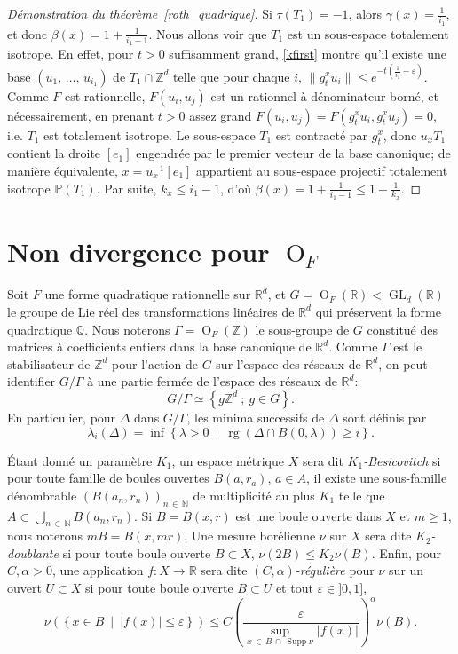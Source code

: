 \documentclass[AHL,Unicode,longabstracts,francais,published]{cedram}
\DeclareMathOperator{\GL}{GL}
\DeclareMathOperator{\GO}{O}
\DeclareMathOperator{\Supp}{Supp}
\DeclareMathOperator{\rg}{rg}
\newcommand{\R}{\mathbb{R}}
\newcommand{\Z}{\mathbb{Z}}
\newcommand{\N}{\mathbb{N}}
\newcommand{\Q}{\mathbb{Q}}
\newcommand{\PP}{\mathbb{P}}
\newcommand{\eps}{\varepsilon}
\begin{document}
\begin{proof}[Démonstration du théorème~\ref{roth_quadrique}]
Si $\tau(T_1)=-1$, alors $\gamma(x)=\frac{1}{i_1}$, et donc $\beta(x)=1+\frac{1}{i_1-1}$. Nous allons voir que $T_1$ est un sous-espace totalement isotrope. En effet, pour $t>0$ suffisamment grand, \eqref{kfirst} montre qu'il existe une base $(u_1,\,\dots,\,u_{i_1})$ de $T_1\cap\Z^d$ telle que pour chaque $i$, $\|g_t^xu_i\|\leq e^{-t(\frac{1}{i_1}-\eps)}$. Comme $F$ est rationnelle, $F(u_i,u_j)$ est un rationnel à dénominateur borné, et nécessairement, en prenant $t>0$ assez grand $F(u_i,u_j)=F(g_t^xu_i,g_t^xu_j)=0$, i.e. $T_1$ est totalement isotrope. Le sous-espace $T_1$ est contracté par $g_t^x$, donc $u_xT_1$ contient la droite $[e_1]$ engendrée par le premier vecteur de la base canonique; de manière équivalente, $x=u_x^{-1}[e_1]$ appartient au sous-espace projectif totalement isotrope $\PP(T_1)$. Par suite, $k_x\leq i_1-1$, d'où $\beta(x)=1+\frac{1}{i_1-1}\leq 1+\frac{1}{k_x}$.
\end{proof}



\section{Non divergence pour \texorpdfstring{$\GO_F$}{GOF}}\label{sec:nd}

Soit $F$ une forme quadratique rationnelle sur $\R^d$, et $G=\GO_F(\R)<\GL_d(\R)$ le groupe de Lie réel des transformations linéaires de $\R^d$ qui préservent la forme quadratique $\Q$. Nous noterons $\Gamma=\GO_F(\Z)$ le sous-groupe de $G$ constitué des matrices à coefficients entiers dans la base canonique de $\R^d$. Comme $\Gamma$ est le stabilisateur de $\Z^d$ pour l'action de $G$ sur l'espace des réseaux de $\R^d$, on peut identifier $G/\Gamma$ à une partie fermée de l'espace des réseaux de $\R^d$:
\[
G/\Gamma \simeq \left\{g\Z^d\ ;\ g\in G\right\}.
\]
En particulier, pour $\Delta$ dans $G/\Gamma$, les minima successifs de $\Delta$ sont définis par
\[
\lambda_i(\Delta) = \inf\left\{\lambda>0\ \middle|\ \rg(\Delta\cap B(0,\lambda))\geq i\right\}.
\]

Étant donné un paramètre $K_1$, un espace métrique $X$ sera dit \emph{$K_1$-Besicovitch} si pour toute famille de boules ouvertes $B(a,r_a)$, $a\in A$, il existe une sous-famille dénombrable $(B(a_n,r_n))_{n\,\in\,\N}$ de multiplicité au plus $K_1$ telle que $A\subset\bigcup_{n\,\in\,\N}B(a_n,r_n)$. Si $B=B(x,r)$ est une boule ouverte dans $X$ et $m\geq 1$, nous noterons $mB=B(x,mr)$. Une mesure borélienne $\nu$ sur $X$ sera dite \emph{$K_2$-doublante} si pour toute boule ouverte $B\subset X$, $\nu(2B)\leq K_2\nu(B)$. Enfin, pour $C,\alpha>0$, une application $f:X\to\R$ sera dite \emph{$(C,\alpha)$-régulière} pour $\nu$ sur un ouvert $U\subset X$ si pour toute boule ouverte $B\subset U$ et tout $\eps\in]0,1]$,
\[
\nu\left(\left\{x\in B\ \middle|\ |f(x)|\leq\eps\right\}\right)
\leq C\left(\frac{\eps}{\sup_{x\,\in\,B\,\cap\,\Supp\nu}|f(x)|}\right)^\alpha \nu(B).
\]
\end{document}
